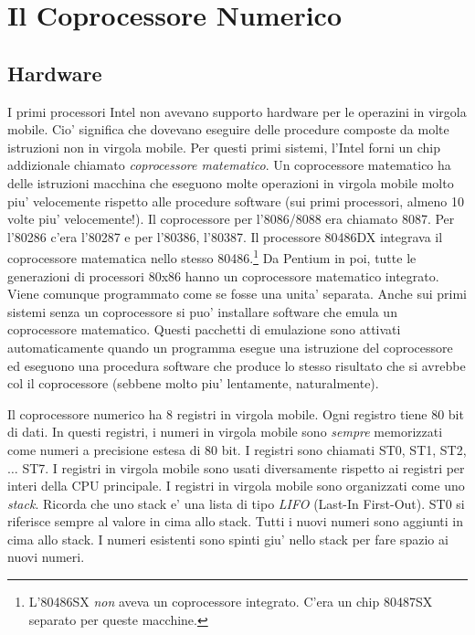 \section{Il Coprocessore Numerico}
\subsection{Hardware}
I primi processori Intel non avevano supporto hardware per le operazini
in virgola mobile. Cio' significa che dovevano eseguire delle
procedure composte da molte istruzioni non in virgola mobile. Per
questi primi sistemi, l'Intel forni un chip addizionale chiamato
\emph{coprocessore matematico}. Un coprocessore matematico ha delle
istruzioni macchina che eseguono molte operazioni in virgola mobile
molto piu' velocemente rispetto alle procedure software (sui primi
processori, almeno 10 volte piu' velocemente!). Il coprocessore per 
l'8086/8088 era chiamato 8087. Per l'80286 c'era l'80287 e per
l'80386, l'80387. Il processore 80486DX integrava il coprocessore
matematica nello stesso 80486.\footnote{L'80486SX \emph{non} aveva
un coprocessore integrato. C'era un chip 80487SX separato per
queste macchine.} Da Pentium in poi, tutte le generazioni di
processori 80x86 hanno un coprocessore matematico integrato. Viene
comunque programmato come se fosse una unita' separata. Anche sui 
primi sistemi senza un coprocessore si puo' installare software
che emula un coprocessore matematico. Questi pacchetti di emulazione
sono attivati automaticamente quando un programma esegue una
istruzione del coprocessore ed eseguono una procedura software
che produce lo stesso risultato che si avrebbe col il coprocessore
(sebbene molto piu' lentamente, naturalmente). 

Il coprocessore numerico ha 8 registri in virgola mobile. Ogni registro 
tiene 80 bit di dati. In questi registri, i numeri in virgola mobile 
sono \emph{sempre} memorizzati come numeri a precisione estesa
di 80 bit. I registri sono chiamati {\code ST0}, {\code ST1}, {\code
ST2}, $\ldots$ {\code ST7}. I registri in virgola mobile sono usati
diversamente rispetto ai registri per interi della CPU principale.
I registri in virgola mobile sono organizzati come uno \emph{stack}.
Ricorda che uno stack e' una lista di tipo \emph{LIFO} 
(Last-In First-Out). {\code ST0} si riferisce sempre al valore
in cima allo stack. Tutti i nuovi numeri sono aggiunti in cima allo
stack. I numeri esistenti sono spinti giu' nello stack per fare
spazio ai nuovi numeri. 

